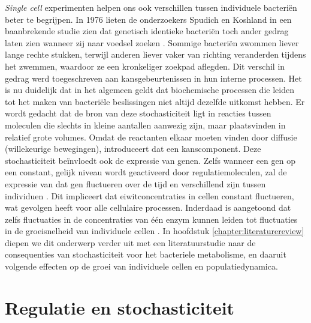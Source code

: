 \textit{Single cell} experimenten helpen ons ook verschillen tussen individuele bacteriën beter te begrijpen.
%
In 1976 lieten de onderzoekers Spudich en Koshland in een baanbrekende studie zien dat genetisch identieke bacteriën toch ander gedrag laten zien wanneer zij naar voedsel zoeken \cite{Spudich1976}.
%
Sommige bacteriën zwommen liever lange rechte stukken, terwijl anderen liever vaker van richting veranderden tijdens het zwemmen, waardoor ze een kronkeliger zoekpad aflegden.
%
Dit verschil in gedrag werd toegeschreven aan kansgebeurtenissen in hun interne processen.
%
Het is nu duidelijk dat in het algemeen geldt dat biochemische processen die leiden tot het maken van bacteriële beslissingen niet altijd dezelfde uitkomst hebben. 
%
Er wordt gedacht dat de bron van deze stochasticiteit ligt in reacties tussen moleculen die slechts in kleine aantallen aanwezig zijn, maar plaatsvinden in relatief grote volumes.
%
Omdat de reactanten elkaar moeten vinden door diffusie (willekeurige bewegingen), introduceert dat een kanscomponent.
%
Deze stochasticiteit beïnvloedt ook de expressie van genen.  
%
Zelfs wanneer een gen op een constant, gelijk niveau wordt geactiveerd door regulatiemoleculen, zal de expressie van dat gen fluctueren over de tijd en verschillend zijn tussen individuen \cite{Elowitz2002}. 
%
Dit impliceert dat eiwitconcentraties in cellen constant fluctueren, wat gevolgen heeft voor alle cellulaire processen. 
%
Inderdaad is aangetoond dat zelfs fluctuaties in de concentraties van één enzym kunnen leiden tot fluctuaties in de groeisnelheid van individuele cellen \cite{Kiviet2014}.
%
In hoofdstuk \ref{chapter:literaturereview} diepen we dit onderwerp verder uit met
een literatuurstudie naar de consequenties van stochasticiteit voor het bacteriele metabolisme, en daaruit volgende effecten op de groei van individuele cellen en populatiedynamica.

\section*{Regulatie en stochasticiteit}

